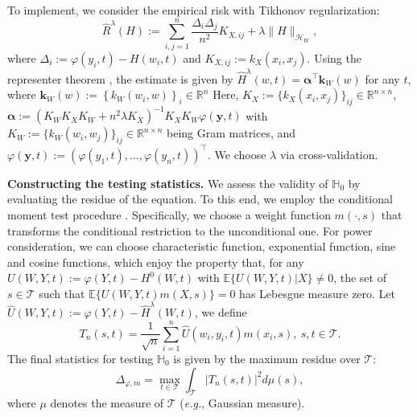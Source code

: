 \documentclass[
  12pt]{article}
\def\mE{\mathbb{E}}
\def\cH{\mathcal{H}}
\def\cL{\mathcal{L}}
\def\cT{\mathcal{T}}
\def\mE{\mathbb{E}}
\begin{document}
To implement, we consider the empirical risk with Tikhonov regularization:
\begin{equation}\label{eq:mmr-vstat}
\widehat{R}^{\lambda}(H):=\sum_{i,j=1}^n{\frac{\Delta_i\Delta_j}{n^2}K_{X,ij}}+\lambda \|H\|_{\mathcal{H}_W},
\end{equation}
where $\Delta_i:= \varphi(y_i,t)-H(w_i,t)$ and $K_{X,ij}:= k_X(x_i, x_j)$. Using the representer theorem \citep{scholkopf2001generalized}, the estimate is given by $\widehat{H}^{\lambda}(w,t)=\boldsymbol{\alpha}^{\top}\boldsymbol{k}_W(w)$ for any $t$, where $\boldsymbol{k}_W(w):=\left\{ k_W(w_i,w)\right\}_i\in\mathbb{R}^n$ 
Here, $K_X:=\{k_X(x_i,x_j)\}_{ij}\in \mathbb{R}^{n\times n}$, $\boldsymbol{\alpha}:=(K_WK_XK_W+n^2\lambda K_X)^{-1}K_XK_W\varphi(\boldsymbol{y},t)$ with $K_W:=\{k_W(w_i,w_j)\}_{ij}\in \mathbb{R}^{n\times n}$ being Gram matrices, and $\varphi(\boldsymbol{y},t):= (\varphi(y_{1},t),\ldots,\varphi(y_{n},t))^{\top}$. We choose $\lambda$ via cross-validation. 



\textbf{Constructing the testing statistics.} We assess the validity of $\mathbb H_0$ by evaluating the residue of the equation. To this end, we employ the conditional moment test procedure \citep{bierens1982consistent,bierens1997asymptotic}. Specifically, we choose a weight function $m(\cdot,s)$ that transforms the conditional restriction to the unconditional one. For power consideration, we can choose characteristic function, exponential function, sine and cosine functions, which enjoy the property \citep{stinchcombe1998consistent} that, for any $U(W,Y,t):=\varphi(Y,t) -H^{0}(W,t)$ with $\mE\{U(W,Y,t)|X\} \neq 0$, the set of $s \in \cT$ such that $\mE\{U(W,Y,t)m(X,s)\} = 0$ has Lebesgue measure zero. Let $\widehat{U}(W,Y,t):=\varphi(Y,t) -\widehat{H}^{\lambda}(W,t)$, we define 
\begin{equation}\label{eq.tn_st}
    T_n(s,t) =\frac{1}{\sqrt{n}}\sum_{i=1}^n{\widehat{U}(w_i,y_i,t)m(x_i,s)}, \ s,t \in \cT. 
\end{equation}
The final statistics for testing $\mathbb{H}_0$ is given by the maximum residue over $\cT$:
\begin{equation}\label{eq.icm-statistics}
   \Delta_{\varphi ,m} =\max_{t\in\mathcal{T}}\int_{\mathcal{T}}{| T_n(s,t)|^2d\mu(s)},
\end{equation}
where $\mu$ denotes the measure of $\cT$ (\emph{e.g.}, Gaussian measure).
\end{document}
